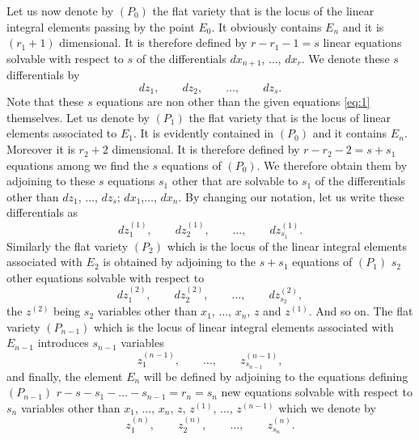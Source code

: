 \documentclass[leqno,11pt]{book}
\theoremstyle{shape1}
\theoremstyle{shapesmall}
\begin{document}
Let us now denote by $(P_{0})$ the flat variety that is the locus of the linear integral elements passing by the point $E_{0}$. It obviously contains $E_{n}$ and it is $(r_{1}+1)$ dimensional. It is therefore defined by $r-r_{1}-1=s$ linear equations solvable with respect to $s$ of the differentials $dx_{n+1}$, $\dots$, $dx_{r}$. We denote these $s$ differentials by
\[
dz_{1},\qquad dz_{2},\qquad \dots,\qquad dz_{s}.
\]
Note that these $s$ equations are non other than the given equations \eqref{eq:1} themselves. Let us denote by $(P_{1})$ the flat variety that is the locus of linear elements associated to $E_{1}$. It is evidently contained in $(P_{0})$ and it contains $E_{n}$. Moreover it is $r_{2}+2$ dimensional. It is therefore defined by $r-r_{2}-2=s+s_{1}$ equations among we find the $s$ equations of $(P_{0})$. We therefore obtain them by adjoining to these $s$ equations $s_{1}$ other that are solvable to $s_{1}$ of the differentials other than $dz_{1}$, $\dots$, $dz_{s}$; $dx_{1}$,$\dots$, $dx_{n}$. By changing our notation, let us write these differentials as
\[
dz_{1}^{(1)},\qquad dz_{2}^{(1)},\qquad \dots,\qquad dz_{s_{1}}^{(1)}.
\]
Similarly the flat variety $(P_{2})$ which is the locus of the linear integral elements associated with $E_{2}$ is obtained by adjoining to the $s+s_{1}$ equations of $(P_{1})$ $s_{2}$ other equations solvable with respect to
\[
dz_{1}^{(2)},\qquad dz_{2}^{(2)},\qquad \dots,\qquad dz_{s_{2}}^{(2)},
\]
the $z^{(2)}$ being $s_{2}$ variables other than $x_{1}$, $\dots$, $x_{n}$, $z$ and $z^{(1)}$. And so on. The flat variety $(P_{n-1})$ which is the locus of linear integral elements associated with $E_{n-1}$ introduces $s_{n-1}$ variables
\[
z_{1}^{(n-1)},\qquad\dots,\qquad z_{s_{n-1}}^{(n-1)},
\]
and finally, the element $E_{n}$ will be defined by adjoining to the equations defining $(P_{n-1})$ $r-s-s_{1}-\dots-s_{n-1}=r_{n}=s_{n}$ new equations solvable with respect to $s_{n}$ variables other than $x_{1}$, $\dots$, $x_{n}$, $z$, $z^{(1)}$, $\dots$, $z^{(n-1)}$ which we denote by
\[
z_{1}^{(n)},\qquad z_{2}^{(n)},\qquad \dots,\qquad z_{s_{n}}^{(n)}.
\]
\end{document}
